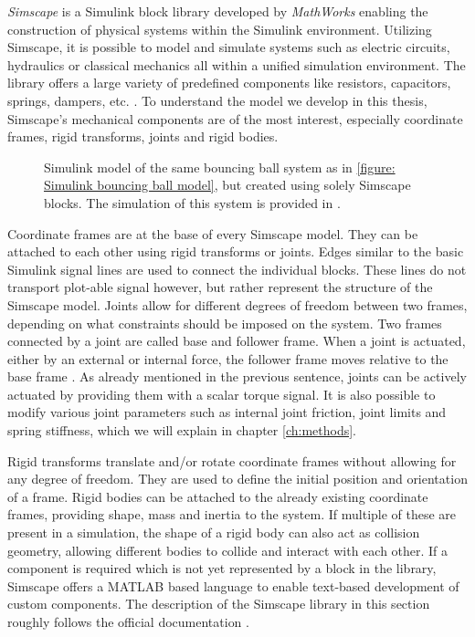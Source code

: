 \textit{Simscape\textsuperscript{\texttrademark}} is a Simulink block library developed by \textit{MathWorks\textsuperscript{\textregistered}} enabling the construction of physical systems within the Simulink environment.
Utilizing Simscape, it is possible to model and simulate systems such as electric circuits, hydraulics or classical mechanics all within a unified simulation environment.
The library offers a large variety of predefined components like resistors, capacitors, springs, dampers, etc. \parencite{matlabSimscapeDocumentation}.
To understand the model we develop in this thesis, Simscape's mechanical components are of the most interest, especially coordinate frames, rigid transforms, joints and rigid bodies.

\begin{figure}[h!]
	\centering
	\centerline{}
	\caption[Simscape bouncing ball example]{Simulink model of the same bouncing ball system as in \ref{figure: Simulink bouncing ball model}, but created using solely Simscape blocks. The simulation of this system is provided in \cite{VIDEO1}.} 
	\label{figure: Simscape Bouncing Ball Example}
\end{figure}

Coordinate frames are at the base of every Simscape model.
They can be attached to each other using rigid transforms or joints.
Edges similar to the basic Simulink signal lines are used to connect the individual blocks.
These lines do not transport plot-able signal however, but rather represent the structure of the Simscape model.
Joints allow for different degrees of freedom between two frames, depending on what constraints should be imposed on the system.
Two frames connected by a joint are called base and follower frame.
When a joint is actuated, either by an external or internal force, the follower frame moves relative to the base frame \parencite{thilderkvist2015motion}.
As already mentioned in the previous sentence, joints can be actively actuated by providing them with a scalar torque signal.
It is also possible to modify various joint parameters such as internal joint friction, joint limits and spring stiffness, which we will explain in chapter \ref{ch:methods}.

Rigid transforms translate and/or rotate coordinate frames without allowing for any degree of freedom.
They are used to define the initial position and orientation of a frame.
Rigid bodies can be attached to the already existing coordinate frames, providing shape, mass and inertia to the system.
If multiple of these are present in a simulation, the shape of a rigid body can also act as collision geometry, allowing different bodies to collide and interact with each other.
If a component is required which is not yet represented by a block in the library, Simscape offers a MATLAB based language to enable text-based development of custom components.
The description of the Simscape library in this section roughly follows the official documentation \parencite{matlabSimscapeDocumentation}.

